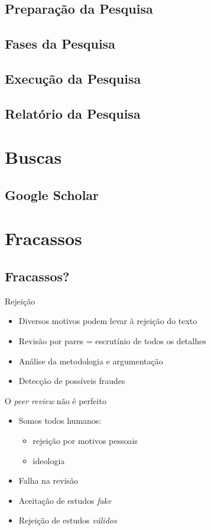 \documentclass{beamer}
\begin{document}
\subsection{Preparação da Pesquisa}

\subsection{Fases da Pesquisa}

\subsection{Execução da Pesquisa}

\subsection{Relatório da Pesquisa}



\section{Buscas}

\subsection{Google Scholar}


\section{Fracassos}

\subsection{Fracassos?}

\begin{frame}{Rejeição}
  \begin{itemize}
  \item Diversos motivos podem levar à rejeição do texto
  \item Revisão por pares = escrutínio de todos os detalhes
  \item Análise da metodologia e argumentação
  \item Detecção de possíveis fraudes
  \end{itemize}
\end{frame}

\begin{frame}{O {\em peer review} não é perfeito}
  \begin{itemize}
  \item Somos todos humanos:
    \begin{itemize}
    \item rejeição por motivos pessoais
    \item ideologia
    \end{itemize}
  \item Falha na revisão
  \item Aceitação de estudos {\em fake}
  \item Rejeição de estudos {\em válidos}
  \end{itemize}
\end{frame}
\end{document}
